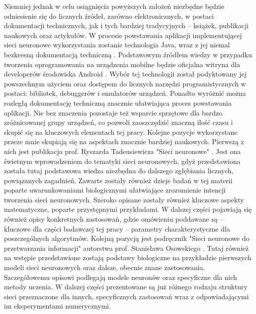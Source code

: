 Niemniej jednak w celu osiągnięcia powyższych założeń niezbędne będzie odniesienie się do licznych źródeł, zarówno elektronicznych, w postaci dokumentacji technicznych, jak i tych bardziej tradycyjnych -- książek, publikacji naukowych oraz artykułów. W procesie powstawania aplikacji implementującej sieci neuronowe wykorzystania zostanie technologia Java, wraz z jej niemal bezkresną dokumentacją techniczną \cite{java}. Podstawowym źródłem wiedzy w przypadku tworzenia oprogramowania na urządzenia mobilne będzie oficjalna witryna dla developerów środowiska Android \cite{android}. Wybór tej technologii został podyktowany jej powszechnym użyciem oraz dostępem do licznych narzędzi programistycznych w postaci: bibliotek, debuggerów i emulatorów urządzeń. Ponadto wyróżnić można rozległą dokumentację techniczną znacznie ułatwiająca proces powstawania aplikacji. Nie bez znaczenia pozostaje też wsparcie sprzętowe dla bardzo zróżnicowanej grupy urządzeń, co pozwoli zaoszczędzić znaczną ilość czasu i skupić się na kluczowych elementach tej pracy. Kolejne pozycje wykorzystane przeze mnie skupiają się na aspektach znacznie bardziej naukowych. Pierwszą z nich jest publikacja prof. Ryszarda Tadeusiewicza "Sieci neuronowe" \cite{Tad93}. Jest ona świetnym wprowadzeniem do tematyki sieci neuronowych, gdyż przedstawiona została tutaj podstawowa wiedza niezbędna do dalszego zgłębiania licznych, powiązanych zagadnień. Zawarte zostały również dzieje badań w tej materii poparte uwarunkowaniami biologicznymi ułatwiające zrozumienie intencji tworzenia sieci neuronowych. Szeroko opisane zostały również kluczowe aspekty matematyczne, poparte przystępnymi przykładami. W dalszej części pojawiają się również opisy konkretnych zastosowań, gdzie omówieniu poddawane są -- kluczowe dla części badawczej tej pracy -- parametry charakterystyczne dla poszczególnych algorytmów. Kolejną pozycją jest podręcznik "Sieci neuronowe do przetwarzania informacji" autorstwa prof. Stanisława Osowskiego \cite{Oso06}. Tutaj również na wstępie przedstawione zostają podstawy biologiczne na przykładzie pierwszych modeli sieci neuronowych oraz dalsze, obecnie znane zastosowania. Szczegółowemu opisowi podlegają modele neuronów oraz specyficzne dla nich metody uczenia. W dalszej części prezentowane są już różnego rodzaju struktury sieci przeznaczone dla innych, specyficznych zastosowań wraz z odpowiadającymi im eksperymentami numerycznymi.
